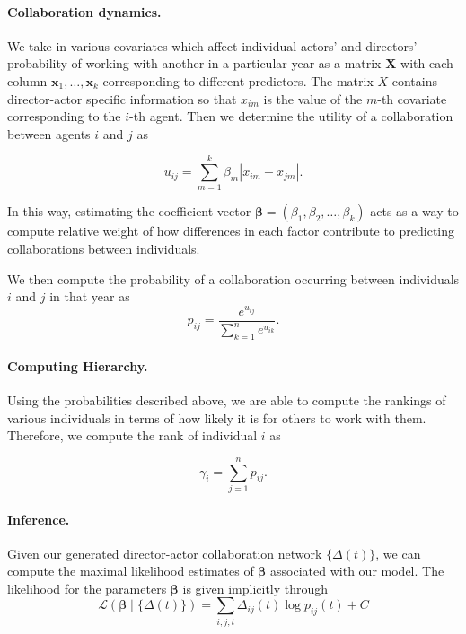 \documentclass{article}
\renewcommand\vec{\mathbf}
\begin{document}
\paragraph{Collaboration dynamics.} We take in various covariates which affect individual actors' and directors' probability of working with another in a particular year as a matrix $\vec{X}$ with each column $\vec{x}_1, \ldots, \vec{x}_k$ corresponding to different predictors. The matrix $X$ contains director-actor specific information so that $x_{im}$ is the value of the $m$-th covariate corresponding to the $i$-th agent. Then we determine the utility of a collaboration between agents $i$ and $j$ as 

\begin{equation}
    u_{ij} = \sum_{m = 1}^{k} \beta_m \left| x_{im} - x_{jm}\right|.
\end{equation}

In this way, estimating the coefficient vector $\vec{\beta} = (\beta_1, \beta_2, \ldots, \beta_k)$ acts as a way to compute relative weight of how differences in each factor contribute to predicting collaborations between individuals. 

We then compute the probability of a collaboration occurring between individuals $i$ and $j$ in that year as 
\begin{equation}
    p_{ij} = \frac{e^{u_{ij}}}{\sum_{k = 1}^{n} e^{u_{ik}}}.
\end{equation}

\paragraph{Computing Hierarchy.}

Using the probabilities described above, we are able to compute the rankings of various individuals in terms of how likely it is for others to work with them. Therefore, we compute the rank of individual $i$ as 

\begin{equation}
    \gamma_i = \sum_{j=1}^{n} p_{ij}.
\end{equation}

\paragraph{Inference.}

Given our generated director-actor collaboration network $\{\Delta(t)\}$, we can compute the maximal likelihood estimates of $\vec{\beta}$ associated with our model. The likelihood for the parameters $\vec{\beta}$ is given implicitly through
\begin{equation}
    \mathcal{L}(\vec{\beta} \mid \{\Delta(t)\}) = \sum_{i,j,t} \Delta_{ij}(t) \log p_{ij}(t) + C
\end{equation}
\end{document}
